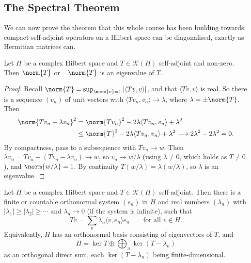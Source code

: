 \documentclass[a4paper]{scrartcl}
\newcommand{\ip}[2]{\langle #1, #2 \rangle}
\newcommand{\Kop}{\mathcal{K}}
\begin{document}
\subsection{The Spectral Theorem}

We can now prove the theorem that this whole course has been building towards: compact self-adjoint operators on a Hilbert space can be diagonalised, exactly as Hermitian matrices can.

\begin{lemma}
	Let $H$ be a complex Hilbert space and $T\in\Kop(H)$ self-adjoint and non-zero. Then $\norm{T}$ or $-\norm{T}$ is an eigenvalue of $T$.
\end{lemma}

\begin{proof}
	Recall $\norm{T} = \sup_{\norm{v}=1}|\ip{Tv}{v}|$, and that $\ip{Tv}{v}$ is real. So there is a sequence $(v_n)$ of unit vectors with $\ip{Tv_n}{v_n}\to\lambda$, where $\lambda = \pm\norm{T}$. Then
	\begin{align*}
		\norm{Tv_n - \lambda v_n}^2 &= \norm{Tv_n}^2 - 2\lambda\ip{Tv_n}{v_n}+\lambda^2 \\
		&\leq \norm{T}^2 - 2\lambda\ip{Tv_n}{v_n}+\lambda^2 \longrightarrow 2\lambda^2 - 2\lambda^2 = 0.
	\end{align*}
	By compactness, pass to a subsequence with $Tv_n \to w$. Then $\lambda v_n = Tv_n - (Tv_n - \lambda v_n)\to w$, so $v_n \to w/\lambda$ (using $\lambda\neq0$, which holds as $T \neq 0$), and $\norm{w/\lambda}=1$. By continuity $T(w/\lambda) = \lambda (w/\lambda)$, so $\lambda$ is an eigenvalue.
\end{proof}

\begin{theorem}
	Let $H$ be a complex Hilbert space and $T \in\Kop(H)$ self-adjoint. Then there is a finite or countable orthonormal system $(e_n)$ in $H$ and real numbers $(\lambda_n)$ with $|\lambda_1|\geq|\lambda_2|\geq\cdots$ and $\lambda_n\to0$ (if the system is infinite), such that
	$$Tv = \sum_n \lambda_n \ip{v}{e_n}e_n \qquad \text{for all } v \in H.$$
	Equivalently, $H$ has an orthonormal basis consisting of eigenvectors of $T$, and
	$$H = \ker T \oplus \bigoplus_n \ker(T-\lambda_n)$$
	as an orthogonal direct sum, each $\ker(T-\lambda_n)$ being finite-dimensional.
\end{theorem}
\end{document}
